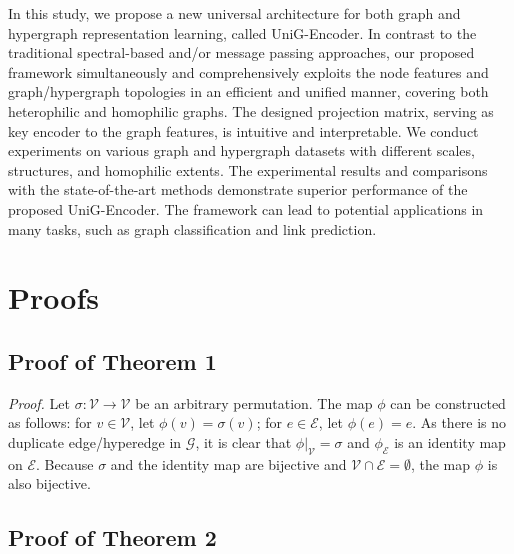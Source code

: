 \documentclass[review]{elsarticle}
\begin{document}
In this study, we propose a new universal architecture for both graph and hypergraph representation learning, called UniG-Encoder. In contrast to the traditional spectral-based and/or message passing approaches, our proposed framework simultaneously and comprehensively exploits the node features and graph/hypergraph topologies in an efficient and unified manner, covering both heterophilic and homophilic graphs. The designed projection matrix, serving as key encoder to the graph features, is intuitive and interpretable. We conduct experiments on various graph and hypergraph datasets with different scales, structures, and homophilic extents. The experimental results and comparisons with the state-of-the-art methods demonstrate superior performance of the proposed UniG-Encoder. The framework can lead to potential applications in many tasks, such as graph classification and link prediction.

\appendix
\section{Proofs}

\subsection{Proof of Theorem 1}

\textit{Proof.} Let $\sigma:\mathcal{V}\to\mathcal{V}$ be an arbitrary permutation. The map $\phi$ can be constructed as follows: for $v\in\mathcal{V}$, let $\phi(v)=\sigma(v)$; for $e\in\mathcal{E}$, let $\phi(e)=e$. As there is no duplicate edge/hyperedge in $\mathcal{G}$, it is clear that $\phi|_\mathcal{V}=\sigma$ and $\phi_\mathcal{E}$ is an identity map on $\mathcal{E}$. Because $\sigma$ and the identity map are bijective and $\mathcal{V}\cap\mathcal{E}=\emptyset$, the map $\phi$ is also bijective.

\subsection{Proof of Theorem 2}
\end{document}
